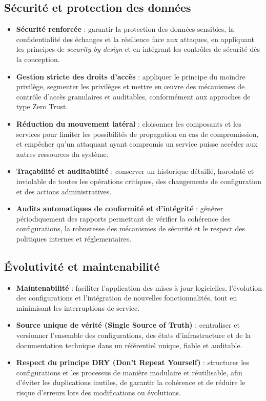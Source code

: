 \subsection*{Sécurité et protection des données}

\begin{itemize}
	\item \textbf{Sécurité renforcée} : garantir la protection des données sensibles, la confidentialité des échanges et la résilience face aux attaques, en appliquant les principes de \emph{security by design} et en intégrant les contrôles de sécurité dès la conception.

	\item \textbf{Gestion stricte des droits d'accès} : appliquer le principe du moindre privilège, segmenter les privilèges et mettre en œuvre des mécanismes de contrôle d'accès granulaires et auditables, conformément aux approches de type Zero Trust.

	\item \textbf{Réduction du mouvement latéral} : cloisonner les composants et les services pour limiter les possibilités de propagation en cas de compromission, et empêcher qu’un attaquant ayant compromis un service puisse accéder aux autres ressources du système.

	\item \textbf{Traçabilité et auditabilité} : conserver un historique détaillé, horodaté et inviolable de toutes les opérations critiques, des changements de configuration et des actions administratives.

	\item \textbf{Audits automatiques de conformité et d'intégrité} : générer périodiquement des rapports permettant de vérifier la cohérence des configurations, la robustesse des mécanismes de sécurité et le respect des politiques internes et réglementaires.
\end{itemize}


\subsection*{Évolutivité et maintenabilité}

\begin{itemize}
	\item \textbf{Maintenabilité} : faciliter l'application des mises à jour logicielles, l'évolution des configurations et l'intégration de nouvelles fonctionnalités, tout en minimisant les interruptions de service.

	\item \textbf{Source unique de vérité (Single Source of Truth)} : centraliser et versionner l'ensemble des configurations, des états d'infrastructure et de la documentation technique dans un référentiel unique, fiable et auditable.

	\item \textbf{Respect du principe DRY (Don’t Repeat Yourself)} : structurer les configurations et les processus de manière modulaire et réutilisable, afin d'éviter les duplications inutiles, de garantir la cohérence et de réduire le risque d'erreurs lors des modifications ou évolutions.

\end{itemize}

